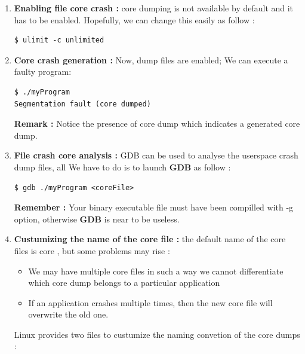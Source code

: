 \begin{enumerate}
	\item \textbf{Enabling file core crash : } core dumping is not available by default and it has to be enabled. Hopefully, we can change this easily as follow :
	
\begin{lstlisting}[style=BashInputStyle]	
$ ulimit -c unlimited
\end{lstlisting}	


	\item \textbf{Core crash generation : } Now, dump files are enabled; We can execute a faulty program:
\begin{lstlisting}[style=BashInputStyle]	
$ ./myProgram
Segmentation fault (core dumped)	
\end{lstlisting}
\textbf{Remark : } Notice the presence of \og core dump \fg which indicates a generated core dump.	
	\item \textbf{File crash core analysis : } GDB can be used to analyse the userspace crash dump files, all We have to do is to launch \textbf{GDB} as follow : 
\begin{lstlisting}[style=BashInputStyle]	
$ gdb ./myProgram <coreFile>	
\end{lstlisting}	


\textbf{\color{orange}Remember :} Your binary executable file must have been compilled with -g option, otherwise \textbf{GDB} is near to be useless.

	\item \textbf{Custumizing the name of the core file : }
	the default name of the core files is \og core \fg, but some problems may rise :
		\begin{itemize}
			\item {We may have multiple core files in such a way we cannot differentiate which core dump belongs to a particular
application}
			\item {If an application crashes multiple times, then the new core file will overwrite the old one.}
		\end{itemize}
		
		Linux provides two files to custumize the naming convetion of the core dumps :
		

\end{enumerate}
